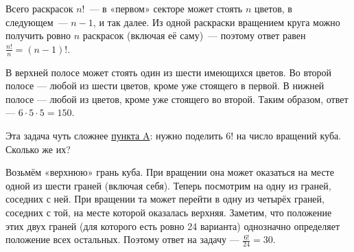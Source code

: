 \begin{itemize}
\itA \label{mgap-ba} Всего раскрасок $n!$~— в «первом» секторе может стоять $n$ цветов, в следующем~— $n-1$, и так далее. Из одной раскраски вращением круга можно получить ровно $n$ раскрасок (включая её саму)~— поэтому ответ равен $\tfrac{n!}{n} = (n-1)!$.

\itB В верхней полосе может стоять один из шести имеющихся цветов. Во второй полосе — любой из шести цветов, кроме уже стоящего в первой. В нижней полосе — любой из цветов, кроме уже стоящего во второй. Таким образом, ответ — $6 \cdot 5 \cdot 5 = 150$.

\itC Эта задача чуть сложнее \hyperref[mgap-ba]{пункта A}: нужно поделить $6!$ на число вращений куба. Сколько же их?

\ms Возьмём «верхнюю» грань куба. При вращении она может оказаться на месте одной из шести граней (включая себя). Теперь посмотрим на одну из граней, соседних с ней. При вращении та может перейти в одну из четырёх граней, соседних с той, на месте которой оказалась верхняя. Заметим, что положение этих двух граней (для которого есть ровно 24 варианта) однозначно определяет положение всех остальных. Поэтому ответ на задачу — $\tfrac{6!}{24} = 30$.
\end{itemize}